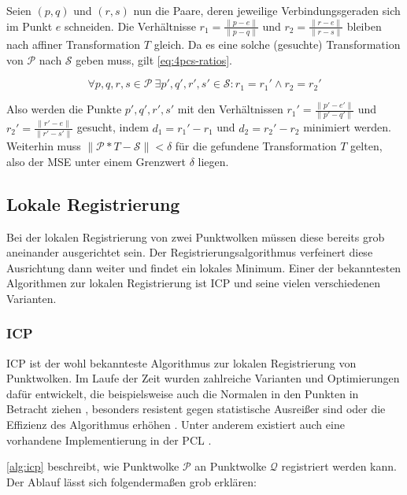 Seien $(p, q)$ und $(r, s)$ nun die Paare, deren jeweilige Verbindungsgeraden sich im Punkt $e$ schneiden.
Die Verhältnisse $r_1 = \frac{\|p - e\|}{\|p - q\|}$ und $r_2 = \frac{\|r - e\|}{\|r - s\|}$ bleiben nach affiner Transformation $T$ gleich.
Da es eine solche (gesuchte) Transformation von $\mathcal{P}$ nach $\mathcal{S}$ geben muss, gilt \autoref{eq:4pcs-ratios}.

\begin{equation}
\label{eq:4pcs-ratios}
\forall p,q,r,s \in \mathcal{P}\ \exists p',q',r',s' \in \mathcal{S} : r_1 = r_1' \wedge r_2 = r_2'
\end{equation}

Also werden die Punkte $p',q',r',s'$ mit den Verhältnissen $r_1' = \frac{\|p' - e'\|}{\|p' - q'\|}$ und $r_2' = \frac{\|r' - e\|}{\|r' - s'\|}$ gesucht, indem $d_1 = r_1' - r_1$ und $d_2 = r_2' - r_2$ minimiert werden.
Weiterhin muss $\|\mathcal{P} * T - \mathcal{S}\| < \delta$ für die gefundene Transformation $T$ gelten, also der \ac{MSE} unter einem Grenzwert $\delta$ liegen.


\subsection{Lokale Registrierung}
\label{subsec:local-registration}

Bei der lokalen Registrierung von zwei Punktwolken müssen diese bereits grob aneinander ausgerichtet sein.
Der Registrierungsalgorithmus verfeinert diese Ausrichtung dann weiter und findet ein lokales Minimum.
Einer der bekanntesten Algorithmen zur lokalen Registrierung ist \ac{ICP} und seine vielen verschiedenen Varianten.


\subsubsection{\acl{ICP}}
\label{subsubsec:icp}

\ac{ICP} \cite{besl1992method} ist der wohl bekannteste Algorithmus zur lokalen Registrierung von Punktwolken.
Im Laufe der Zeit wurden zahlreiche Varianten und Optimierungen dafür entwickelt, die beispielsweise auch die Normalen in den Punkten in Betracht ziehen \cite{munch2010modified}, besonders resistent gegen statistische Ausreißer sind \cite{bouaziz2013sparse} oder die Effizienz des Algorithmus erhöhen \cite{rusinkiewicz2001efficient}. Unter anderem existiert auch eine vorhandene Implementierung in der \ac{PCL} \cite{holz2015registration}.

\autoref{alg:icp} beschreibt, wie Punktwolke $\mathcal{P}$ an Punktwolke $\mathcal{Q}$ registriert werden kann.
Der Ablauf lässt sich folgendermaßen grob erklären:

